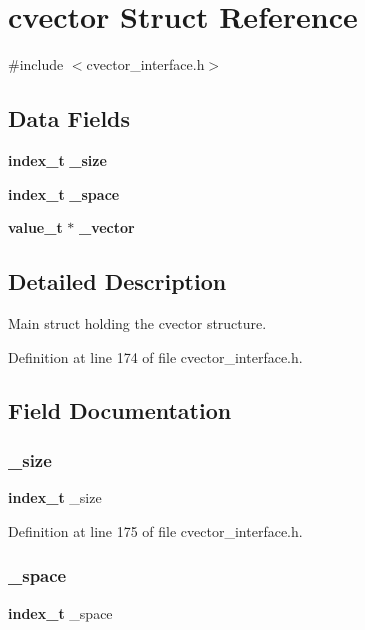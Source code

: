 \section{cvector Struct Reference}
\label{structcvector}


{\ttfamily \#include $<$cvector\+\_\+interface.\+h$>$}

\subsection*{Data Fields}
\begin{DoxyCompactItemize}
\item 
\textbf{ index\+\_\+t} \textbf{ \+\_\+size}
\item 
\textbf{ index\+\_\+t} \textbf{ \+\_\+space}
\item 
\textbf{ value\+\_\+t} $\ast$ \textbf{ \+\_\+vector}
\end{DoxyCompactItemize}


\subsection{Detailed Description}
Main struct holding the cvector structure. 

Definition at line 174 of file cvector\+\_\+interface.\+h.



\subsection{Field Documentation}
\mbox{\label{structcvector_a44c9984fcdd1c44d35235c67909dcc79}} 
\subsubsection{\+\_\+size}
{\footnotesize\ttfamily \textbf{ index\+\_\+t} \+\_\+size}



Definition at line 175 of file cvector\+\_\+interface.\+h.

\mbox{\label{structcvector_a5948a8ef12921a8fc535fbcb48d4d4d4}} 
\subsubsection{\+\_\+space}
{\footnotesize\ttfamily \textbf{ index\+\_\+t} \+\_\+space}



